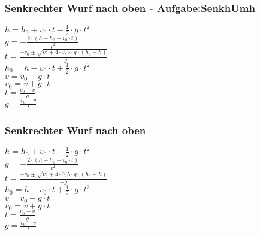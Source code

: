 \subsubsection{Senkrechter Wurf nach oben  - Aufgabe:SenkhUmh} 
\begin{minipage}{0.45\textwidth} 
$ h = h_{0}  + v_{0} \cdot t - \frac{1}{2}\cdot g\cdot t^{2} $\\ 
$ g = - \frac{2\cdot (h - h_{0}  - v_{0} \cdot t)}{     t^{2} } $\\ 
$ t = \frac{-v_{0}  \pm \sqrt{v_{0} ^{2} +4\cdot 0,5\cdot g\cdot (h_{0}  -h)}}{      -g} $\\ 
$ h_{0}  = h - v_{0} \cdot t + \frac{1}{2}\cdot g\cdot t^{2} $\\ 
$ v = v_{0}  - g\cdot t $\\ 
$ v_{0}  = v + g\cdot t $\\ 
$ t = \frac{v_{0} -v}{  g} $\\ 
$ g = \frac{v_{0}  - v}{  t} $\\ 
\end{minipage} 
\begin{minipage}{0.45\textwidth} 
 
\end{minipage} 
\subsubsection{Senkrechter Wurf nach oben} 
\begin{minipage}{0.45\textwidth} 
$ h = h_{0}  + v_{0} \cdot t - \frac{1}{2}\cdot g\cdot t^{2} $\\ 
$ g = - \frac{2\cdot (h - h_{0}  - v_{0} \cdot t)}{     t^{2} } $\\ 
$ t = \frac{-v_{0}  \pm \sqrt{v_{0} ^{2} +4\cdot 0,5\cdot g\cdot (h_{0}  -h)}}{      -g} $\\ 
$ h_{0}  = h - v_{0} \cdot t + \frac{1}{2}\cdot g\cdot t^{2} $\\ 
$ v = v_{0}  - g\cdot t $\\ 
$ v_{0}  = v + g\cdot t $\\ 
$ t = \frac{v_{0} -v}{  g} $\\ 
$ g = \frac{v_{0}  - v}{  t} $\\ 
\end{minipage} 
\begin{minipage}{0.45\textwidth} 
 
\end{minipage} 
